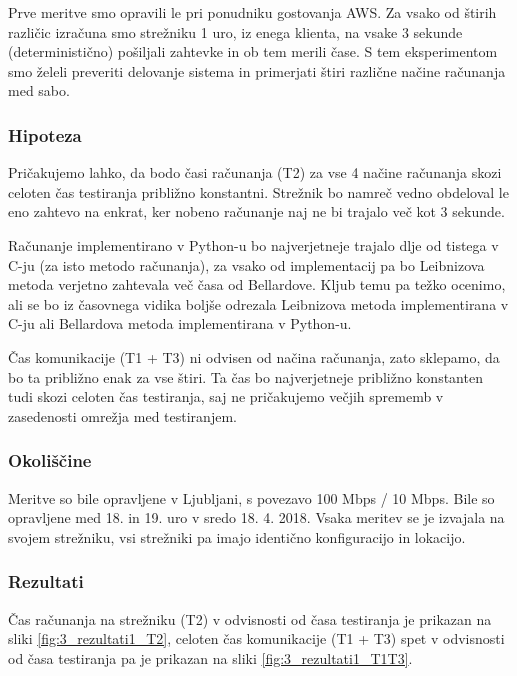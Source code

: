 Prve meritve smo opravili le pri ponudniku gostovanja AWS.
Za vsako od štirih različic izračuna smo strežniku 1 uro, iz enega klienta, na vsake 3 sekunde (deterministično) pošiljali zahtevke in ob tem merili čase.
S tem eksperimentom smo želeli preveriti delovanje sistema in primerjati štiri različne načine računanja med sabo.

\subsubsection{Hipoteza}

Pričakujemo lahko, da bodo časi računanja (T2) za vse 4 načine računanja skozi celoten čas testiranja približno konstantni.
Strežnik bo namreč vedno obdeloval le eno zahtevo na enkrat, ker nobeno računanje naj ne bi trajalo več kot 3 sekunde.

Računanje implementirano v Python-u bo najverjetneje trajalo dlje od tistega v C-ju (za isto metodo računanja), za vsako od implementacij pa bo Leibnizova metoda verjetno zahtevala več časa od Bellardove.
Kljub temu pa težko ocenimo, ali se bo iz časovnega vidika boljše odrezala Leibnizova metoda implementirana v C-ju ali Bellardova metoda implementirana v Python-u.

Čas komunikacije (T1 + T3) ni odvisen od načina računanja, zato sklepamo, da bo ta približno enak za vse štiri.
Ta čas bo najverjetneje približno konstanten tudi skozi celoten čas testiranja, saj ne pričakujemo večjih sprememb v zasedenosti omrežja med testiranjem.

\subsubsection{Okoliščine}

Meritve so bile opravljene v Ljubljani, s povezavo 100 Mbps / 10 Mbps.
Bile so opravljene med 18. in 19. uro v sredo 18. 4. 2018.
Vsaka meritev se je izvajala na svojem strežniku, vsi strežniki pa imajo identično konfiguracijo in lokacijo.

\subsubsection{Rezultati}

Čas računanja na strežniku (T2) v odvisnosti od časa testiranja je prikazan na sliki \ref{fig:3_rezultati1_T2}, celoten čas komunikacije (T1 + T3) spet v odvisnosti od časa testiranja pa je prikazan na sliki \ref{fig:3_rezultati1_T1T3}.

